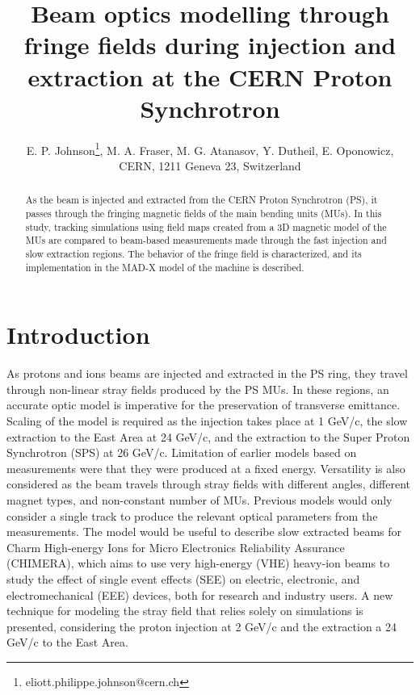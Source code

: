 \documentclass[a4paper,
               biblatex,     %
               keeplastbox,   %
               ]{jacow}
\begin{document}
\title{Beam optics modelling through fringe fields during injection and extraction at the CERN Proton Synchrotron}

\author{E. P. Johnson\thanks{eliott.philippe.johnson@cern.ch}, M. A. Fraser, M. G. Atanasov, Y. Dutheil, E. Oponowicz,\\ CERN, 1211 Geneva 23, Switzerland}
	
\maketitle

%
\begin{abstract}
As the beam is injected and extracted from the CERN Proton Synchrotron (PS), it passes through the fringing magnetic fields of the main bending units (MUs). In this study, tracking simulations using field maps created from a 3D magnetic model of the MUs are compared to beam-based measurements made through the fast injection and slow extraction regions. The behavior of the fringe field is characterized, and its implementation in the MAD-X model of the machine is described.
\end{abstract}


\section{Introduction}
As protons and ions beams are injected and extracted in the PS ring, they travel through non-linear stray fields produced by the PS MUs. In these regions, an accurate optic model is imperative for the preservation of transverse emittance. Scaling of the model is required as the injection takes place at 1 GeV/c, the slow extraction to the East Area at 24 GeV/c, and the extraction to the Super Proton Synchrotron (SPS) at 26 GeV/c. Limitation of earlier models based on measurements were that they were produced at a fixed energy. Versatility is also considered as the beam travels through stray fields with different angles, different magnet types, and non-constant number of MUs. Previous models would only consider a single track to produce the relevant optical parameters from the measurements. The model would be useful to describe slow extracted beams for Charm High-energy Ions for Micro Electronics Reliability Assurance (CHIMERA), which aims to use very high-energy (VHE) heavy-ion beams to study the effect of single event effects (SEE) on electric, electronic, and electromechanical (EEE) devices, both for research and industry users. A new technique for modeling the stray field that relies solely on simulations is presented, considering the proton injection at 2 GeV/c and the extraction a 24 GeV/c to the East Area.
\end{document}
